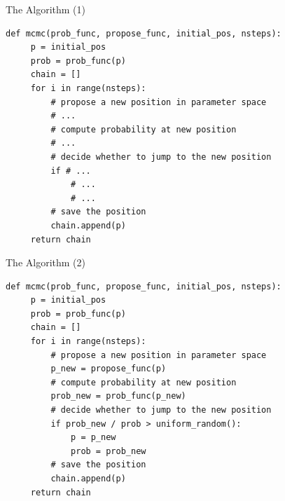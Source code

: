 \documentclass{beamer}
\begin{document}

\begin{frame}[fragile]{The Algorithm (1)}
\begin{small}
\begin{verbatim}
def mcmc(prob_func, propose_func, initial_pos, nsteps):
     p = initial_pos
     prob = prob_func(p)
     chain = []
     for i in range(nsteps):
         # propose a new position in parameter space
         # ...
         # compute probability at new position
         # ...
         # decide whether to jump to the new position
         if # ...
             # ...
             # ...
         # save the position
         chain.append(p)
     return chain
\end{verbatim}
\end{small}
\end{frame}

\begin{frame}[fragile]{The Algorithm (2)}
\begin{small}
\begin{verbatim}
def mcmc(prob_func, propose_func, initial_pos, nsteps):
     p = initial_pos
     prob = prob_func(p)
     chain = []
     for i in range(nsteps):
         # propose a new position in parameter space
         p_new = propose_func(p)
         # compute probability at new position
         prob_new = prob_func(p_new)
         # decide whether to jump to the new position
         if prob_new / prob > uniform_random():
             p = p_new
             prob = prob_new
         # save the position
         chain.append(p)
     return chain
\end{verbatim}
\end{small}
\end{frame}
\end{document}
